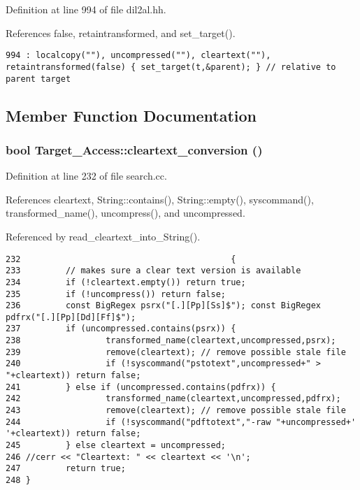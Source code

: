Definition at line 994 of file dil2al.hh.

References false, retaintransformed, and set\_\-target().



\footnotesize\begin{verbatim}994 : localcopy(""), uncompressed(""), cleartext(""), retaintransformed(false) { set_target(t,&parent); } // relative to parent target
\end{verbatim}\normalsize 


\subsection{Member Function Documentation}
\subsubsection{\setlength{\rightskip}{0pt plus 5cm}bool Target\_\-Access::cleartext\_\-conversion ()}\label{classTarget__Access_a8}




Definition at line 232 of file search.cc.

References cleartext, String::contains(), String::empty(), syscommand(), transformed\_\-name(), uncompress(), and uncompressed.

Referenced by read\_\-cleartext\_\-into\_\-String().



\footnotesize\begin{verbatim}232                                          {
233         // makes sure a clear text version is available
234         if (!cleartext.empty()) return true;
235         if (!uncompress()) return false;
236         const BigRegex psrx("[.][Pp][Ss]$"); const BigRegex pdfrx("[.][Pp][Dd][Ff]$");
237         if (uncompressed.contains(psrx)) {
238                 transformed_name(cleartext,uncompressed,psrx);
239                 remove(cleartext); // remove possible stale file
240                 if (!syscommand("pstotext",uncompressed+" > "+cleartext)) return false;
241         } else if (uncompressed.contains(pdfrx)) {
242                 transformed_name(cleartext,uncompressed,pdfrx);
243                 remove(cleartext); // remove possible stale file
244                 if (!syscommand("pdftotext","-raw "+uncompressed+' '+cleartext)) return false;
245         } else cleartext = uncompressed;
246 //cerr << "Cleartext: " << cleartext << '\n';
247         return true;
248 }
\end{verbatim}\normalsize 
{}
